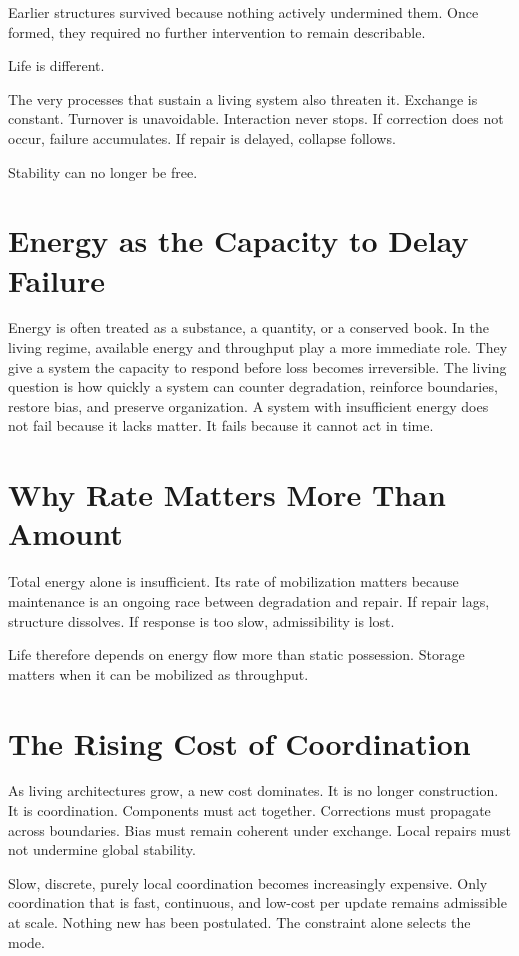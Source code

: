 \documentclass[11pt,twoside,openright]{book}
\begin{document}
Earlier structures survived because nothing actively undermined them. Once formed, they required no further intervention to remain describable.

Life is different.

The very processes that sustain a living system also threaten it. Exchange is constant. Turnover is unavoidable. Interaction never stops. If correction does not occur, failure accumulates. If repair is delayed, collapse follows.

Stability can no longer be free.

\section*{Energy as the Capacity to Delay Failure}

Energy is often treated as a substance, a quantity, or a conserved book. In the living regime, available energy and throughput play a more immediate role. They give a system the capacity to respond before loss becomes irreversible. The living question is how quickly a system can counter degradation, reinforce boundaries, restore bias, and preserve organization. A system with insufficient energy does not fail because it lacks matter. It fails because it cannot act in time.

\section*{Why Rate Matters More Than Amount}

Total energy alone is insufficient. Its rate of mobilization matters because maintenance is an ongoing race between degradation and repair. If repair lags, structure dissolves. If response is too slow, admissibility is lost.

Life therefore depends on energy flow more than static possession. Storage matters when it can be mobilized as throughput.

\section*{The Rising Cost of Coordination}

As living architectures grow, a new cost dominates. It is no longer construction. It is coordination. Components must act together. Corrections must propagate across boundaries. Bias must remain coherent under exchange. Local repairs must not undermine global stability.

Slow, discrete, purely local coordination becomes increasingly expensive. Only coordination that is fast, continuous, and low-cost per update remains admissible at scale. Nothing new has been postulated. The constraint alone selects the mode.
\end{document}
